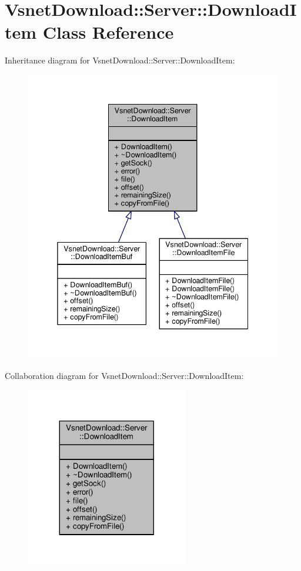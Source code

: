\hypertarget{classVsnetDownload_1_1Server_1_1DownloadItem}{}\section{Vsnet\+Download\+:\+:Server\+:\+:Download\+Item Class Reference}
\label{classVsnetDownload_1_1Server_1_1DownloadItem}


Inheritance diagram for Vsnet\+Download\+:\+:Server\+:\+:Download\+Item\+:
\nopagebreak
\begin{figure}[H]
\begin{center}
\leavevmode
\includegraphics[width=338pt]{db/d83/classVsnetDownload_1_1Server_1_1DownloadItem__inherit__graph}
\end{center}
\end{figure}


Collaboration diagram for Vsnet\+Download\+:\+:Server\+:\+:Download\+Item\+:
\nopagebreak
\begin{figure}[H]
\begin{center}
\leavevmode
\includegraphics[width=200pt]{dd/da5/classVsnetDownload_1_1Server_1_1DownloadItem__coll__graph}
\end{center}
\end{figure}
